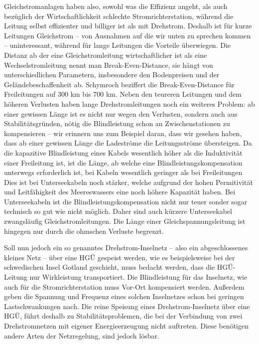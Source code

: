 Gleichstromanlagen haben also, sowohl was die Effizienz angeht, als auch bezüglich der Wirtschaftlichkeit schlechte  Stromrichterstation, während die Leitung selbst effizienter und billiger ist als mit Drehstrom. Deshalb ist für kurze Leitungen Gleichstrom -- von Ausnahmen auf die wir unten zu sprechen kommen -- uninteressant, während für lange Leitungen die Vorteile überwiegen. Die Distanz ab der eine Gleichstromleitung wirtschaftlicher ist als eine Wechselstromleitung nennt man Break-Even-Distance, sie hängt von unterschiedlichen Parametern, insbesondere den Bodenpreisen und der Geländebeschaffenheit ab.
Schymroch\cite{Schymroch} beziffert die Break-Even-Distance für Freileitungen auf 300 km bis 700 km. %
Neben den teureren Leitungen und dem höheren Verlusten haben lange Drehstromleitungen noch ein weiteres Problem: ab einer gewissen Länge ist es nicht nur wegen den Verlusten, sondern auch aus Stabilitätsgründen, nötig die Blindleistung schon an Zwischenstationen zu kompensieren -- wir erinnern uns zum Beispiel daran, dass wir gesehen haben, dass ab einer gewissen Länge die Ladeströme die Leitungsströme übersteigen. Da die kapazitive Blindleistung eines Kabels wesentlich höher als die Induktivität einer Freileitung ist, ist die Länge, ab welche eine Blindleistungskompensation unterwegs erforderlich ist, bei Kabeln wesentlich geringer als bei Freileitungen %
Dies ist bei Unterseekabeln noch stärker, welche aufgrund der hohen Permitivität und Leitfähigkeit des Meereswassers eine noch höhere Kapazität haben. Bei Unterseekabeln ist die Blindleistungskompensation nicht nur teuer sonder sogar technisch so gut wie nicht möglich. Daher sind auch kürzere Unterseekabel zwangsläufig Gleichstromleitungen. %
Die Länge einer Gleichspannungsleitung ist hingegen nur durch die ohmschen Verluste begrenzt.\cite{Schymroch}

Soll nun jedoch ein so genanntes Drehstrom-Inselnetz -- also ein abgeschlossenes kleines Netz -- über eine HGÜ gespeist werden, wie es beispielsweise bei der schwedischen Insel Gotland geschieht, muss bedacht werden, dass die HGÜ-Leitung nur Wirkleistung transportiert. Die Blindleistung für das Inselnetz, wie auch für die Stromrichterstation muss Vor-Ort kompensiert werden. Außerdem geben die Spannung und Frequenz eines solchen Inselnetzes schon bei geringen Lastschwankungen nach. Die reine Speisung eines Drehstrom-Inselnetz über eine HGÜ, führt deshalb zu Stabilitätsproblemen, die bei der Verbindung von zwei Drehstromnetzen mit eigener Energieerzeugung nicht auftreten. Diese benötigen andere Arten der Netzregelung, sind jedoch lösbar.\cite{Schymroch2}

